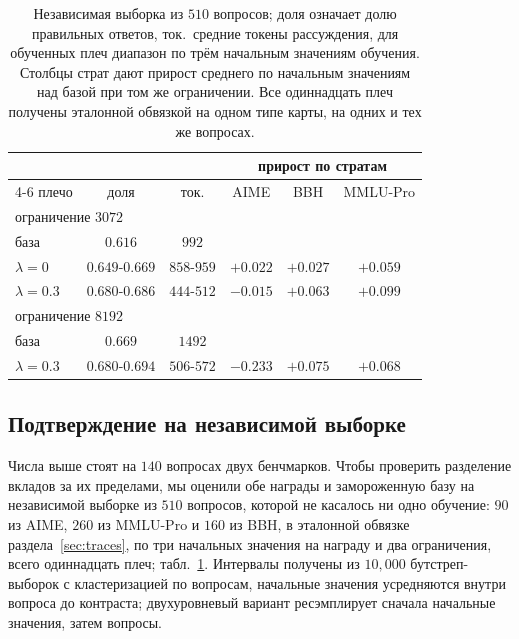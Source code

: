 \documentclass[11pt]{article}
\begin{document}
\begin{table}[t]
\centering
\small
\begin{tabular}{lccccc}
\toprule
 & & & \multicolumn{3}{c}{прирост по стратам} \\
\cmidrule(lr){4-6}
плечо & доля & ток. & AIME & BBH & MMLU-Pro \\
\midrule
\multicolumn{6}{l}{ограничение $3072$} \\
база & $0.616$ & $992$ & & & \\
$\lambda=0$ & $0.649$-$0.669$ & $858$-$959$ & $+0.022$ & $+0.027$ & $+0.059$ \\
$\lambda=0.3$ & $0.680$-$0.686$ & $444$-$512$ & $-0.015$ & $+0.063$ & $+0.099$ \\
\midrule
\multicolumn{6}{l}{ограничение $8192$} \\
база & $0.669$ & $1492$ & & & \\
$\lambda=0.3$ & $0.680$-$0.694$ & $506$-$572$ & $-0.233$ & $+0.075$ & $+0.068$ \\
\bottomrule
\end{tabular}
\caption{Независимая выборка из $510$ вопросов; доля означает долю правильных ответов, ток.\ средние токены рассуждения, для обученных плеч диапазон по трём начальным значениям обучения. Столбцы страт дают прирост среднего по начальным значениям над базой при том же ограничении. Все одиннадцать плеч получены эталонной обвязкой на одном типе карты, на одних и тех же вопросах.}
\label{tab:external}
\end{table}

\subsection{Подтверждение на независимой выборке}
\label{sec:external}

Числа выше стоят на $140$ вопросах двух бенчмарков. Чтобы проверить разделение вкладов за их пределами, мы оценили обе награды и замороженную базу на независимой выборке из $510$ вопросов, которой не касалось ни одно обучение: $90$ из AIME, $260$ из MMLU-Pro и $160$ из BBH, в эталонной обвязке раздела~\ref{sec:traces}, по три начальных значения на награду и два ограничения, всего одиннадцать плеч; табл.~\ref{tab:external}. Интервалы получены из $10{,}000$ бутстреп-выборок с кластеризацией по вопросам, начальные значения усредняются внутри вопроса до контраста; двухуровневый вариант ресэмплирует сначала начальные значения, затем вопросы.
\end{document}
